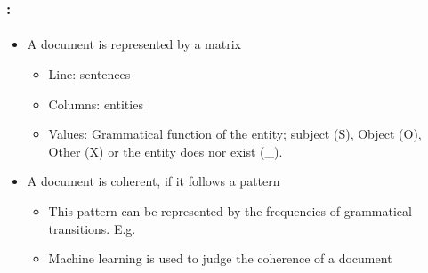\documentclass[xcolor=table]{beamer}
\begin{document}
\begin{frame}
	\frametitle{\insertshortsubtitle: \insertsection}
	\framesubtitle{\insertsubsection}
	
	\begin{itemize}
		\item A document is represented by a matrix
		\begin{itemize}
			\item Line: sentences
			\item Columns: entities
			\item Values: Grammatical function of the entity; subject (S), Object (O), Other (X) or the entity does nor exist (\_).
		\end{itemize}
		\item A document is coherent, if it follows a pattern
		\begin{itemize}
			\item This pattern can be represented by the frequencies of grammatical transitions. E.g. 
			\item Machine learning is used to judge the coherence of a document
		\end{itemize}
		
	\end{itemize}
	
\end{frame}
\end{document}
